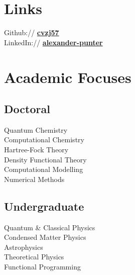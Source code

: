 \documentclass[letterpaper]{deedy-resume-openfont} %
\begin{document}
\begin{minipage}[t]{0.33\textwidth}
\section{Links} 

Github:// \href{https://github.com/cvzj57}{\bf cvzj57} \\
LinkedIn:// \href{https://www.linkedin.com/in/alexander-punter/}{\bf alexander-punter} \\

\sectionspace %


\section[]{Academic Focuses}

\subsection{Doctoral}

Quantum Chemistry \\
Computational Chemistry \\
Hartree-Fock Theory \\
Density Functional Theory \\
Computational Modelling \\
Numerical Methods \\

\sectionspace %


\subsection{Undergraduate}

Quantum \& Classical Physics \\
Condensed Matter Physics \\
Astrophysics \\
Theoretical Physics \\
Functional Programming \\


\end{minipage}
\end{document}
